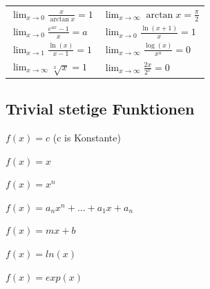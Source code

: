 \documentclass[a4paper]{article}
\def\limxo{\lim_{x\to 0}}
\def\limxi{\lim_{x\to\infty}}
\begin{document}
\begin{table}[h!]
{\begin{tabularx}{\linewidth}{XX}
        $\limxo \frac{x}{\arctan x} = 1$              & $\limxi \arctan x = \frac{\pi}{2}$ \\
        $\limxo \frac{e^{ax}-1}{x} = a$               & $\limxo \frac{\ln(x+1)}{x} = 1$    \\
        $\lim_{x\to 1} \frac{\ln(x)}{x-1} = 1$        & $\limxi \frac{\log(x)}{x^a} = 0$   \\
        $\limxi \sqrt[x]{x} = 1$                      & $\limxi \frac{2x}{2^x} = 0$        \\
        \bottomrule
      \end{tabularx}
  }
\end{table}


\subsection{Trivial stetige Funktionen}
\begin{inparaitem}
  \item $f(x) = c$ (c is Konstante) 
  \item $f(x) = x$ 
  \item $f(x) = x^n$
  \item $f(x) = a_nx^n + ... + a_1x + a_n$
  \item $f(x) = mx + b$ 
  \item $f(x) = ln(x)$
  \item $f(x) = exp(x)$ 
\end{inparaitem}
\end{document}
